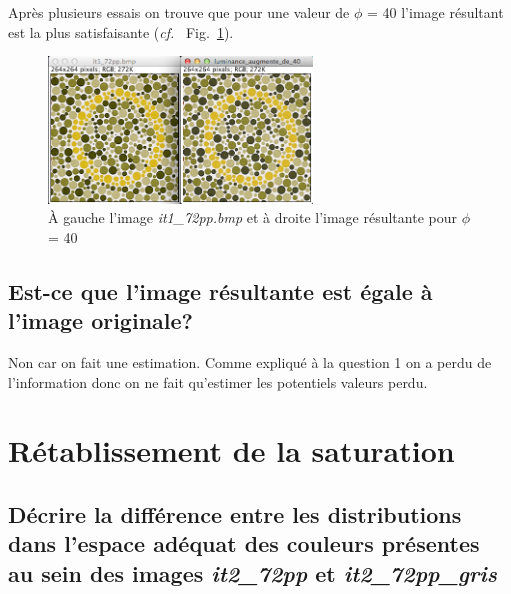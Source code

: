 \documentclass[a4paper,10pt]{article}
\begin{document}
Apr\`es plusieurs essais on trouve que pour une valeur de $\phi$ = 40 l'image r\'esultant est la plus satisfaisante (\emph{cf.} ~Fig.~\ref{it_72pp_changement_luminosite}).

\begin{figure}[ht]
\begin{center}
	\includegraphics[width=7cm]{images/it_72pp_changement_luminosite.png}
\end{center}
	\caption{\`A gauche l'image \emph{it1\_72pp.bmp} et \`a droite l'image r\'esultante pour $\phi$ = 40}
	\label{it_72pp_changement_luminosite}
\end{figure}

\subsection{Est-ce que l'image r\'esultante est \'egale \`a l'image originale?}

Non car on fait une estimation. Comme expliqu\'e \`a la question 1 on a perdu de l'information donc on ne fait qu'estimer les potentiels valeurs perdu.

\section{R\'etablissement de la saturation}

\subsection{D\'ecrire la diff\'erence entre les distributions dans l'espace ad\'equat des couleurs pr\'esentes au sein des images \emph{it2\_72pp} et \emph{it2\_72pp\_gris}}
\end{document}
